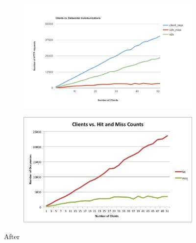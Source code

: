 \documentclass[conference]{IEEEtran}
\begin{document}
\begin{figure}[!h]
	\centering
	\begin{subfigure}[b]{0.49\columnwidth}
		\centering
		\includegraphics[width=\columnwidth]{figures/client-server_1.png}
	\end{subfigure}
	\begin{subfigure}[b]{0.49\columnwidth}
		\centering
		\includegraphics[width=\columnwidth]{figures/hit_miss_separate_1.png}
	\end{subfigure}
	\caption{After}
\end{figure}
\end{document}
